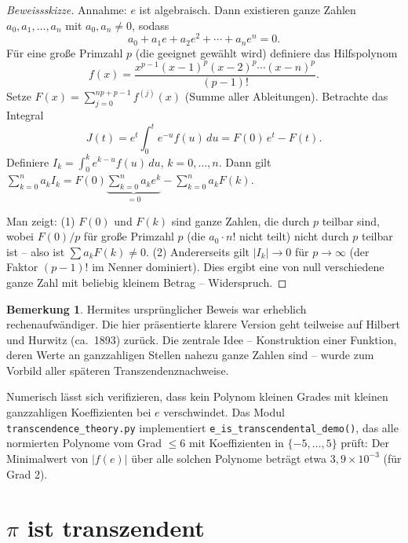 \documentclass[12pt,a4paper]{amsart}
\theoremstyle{definition}
\newtheorem{bemerkung}[theorem]{Bemerkung}
\begin{document}
\begin{proof}[Beweissskizze]
Annahme: $e$ ist algebraisch. Dann existieren ganze Zahlen $a_0, a_1, \ldots,
a_n$ mit $a_0, a_n \neq 0$, sodass
\[
  a_0 + a_1 e + a_2 e^2 + \cdots + a_n e^n = 0.
\]
Für eine große Primzahl $p$ (die geeignet gewählt wird) definiere das Hilfspolynom
\[
  f(x) = \frac{x^{p-1}(x-1)^p(x-2)^p \cdots (x-n)^p}{(p-1)!}.
\]
Setze $F(x) = \sum_{j=0}^{np+p-1} f^{(j)}(x)$ (Summe aller Ableitungen).
Betrachte das Integral
\[
  J(t) = e^t \int_0^t e^{-u} f(u)\,du = F(0)\,e^t - F(t).
\]
Definiere $I_k = \int_0^k e^{k-u} f(u)\,du$, $k = 0, \ldots, n$.
Dann gilt $\sum_{k=0}^n a_k I_k = F(0) \underbrace{\sum_{k=0}^n a_k e^k}_{=0}
- \sum_{k=0}^n a_k F(k)$.

Man zeigt: (1) $F(0)$ und $F(k)$ sind ganze Zahlen, die durch $p$ teilbar sind,
wobei $F(0)/p$ für große Primzahl $p$ (die $a_0 \cdot n!$ nicht teilt) nicht
durch $p$ teilbar ist -- also ist $\sum a_k F(k) \neq 0$.
(2) Andererseits gilt $|I_k| \to 0$ für $p \to \infty$ (der Faktor $(p-1)!$
im Nenner dominiert). Dies ergibt eine von null verschiedene ganze Zahl mit
beliebig kleinem Betrag -- Widerspruch.
\end{proof}

\begin{bemerkung}
Hermites ursprünglicher Beweis war erheblich rechenaufwändiger. Die hier
präsentierte klarere Version geht teilweise auf Hilbert und Hurwitz (ca.\ 1893)
zurück. Die zentrale Idee -- Konstruktion einer Funktion, deren Werte an
ganzzahligen Stellen nahezu ganze Zahlen sind -- wurde zum Vorbild aller
späteren Transzendenznachweise.
\end{bemerkung}

Numerisch lässt sich verifizieren, dass kein Polynom kleinen Grades mit kleinen
ganzzahligen Koeffizienten bei $e$ verschwindet. Das Modul
\texttt{transcendence\_theory.py} implementiert \texttt{e\_is\_transcendental\_demo()},
das alle normierten Polynome vom Grad $\leq 6$ mit Koeffizienten in
$\{-5, \ldots, 5\}$ prüft: Der Minimalwert von $|f(e)|$ über alle solchen
Polynome beträgt etwa $3{,}9 \times 10^{-3}$ (für Grad 2).


\section{\texorpdfstring{$\pi$ ist transzendent}{pi ist transzendent}}
\label{sec:pi-transz}
\end{document}
